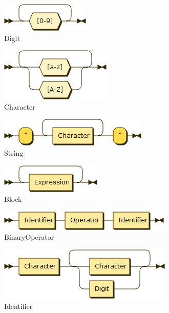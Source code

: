 \begin{figure}[h!]
\centering
\includegraphics[scale=1]{kepek/rr_digit.png}
\caption{Digit}
\label{fig:rr_digit}
\end{figure}

\begin{figure}[h!]
\centering
\includegraphics[scale=1]{kepek/rr_character.png}
\caption{Character}
\label{fig:rr_character}
\end{figure}

\begin{figure}[h!]
\centering
\includegraphics[scale=1]{kepek/rr_string.png}
\caption{String}
\label{fig:rr_string}
\end{figure}

\begin{figure}[h!]
\centering
\includegraphics[scale=1]{kepek/rr_block.png}
\caption{Block}
\label{fig:rr_block}
\end{figure}

\begin{figure}[h!]
\centering
\includegraphics[scale=1]{kepek/rr_binaryoperator.png}
\caption{BinaryOperator}
\label{fig:rr_binaryoperator}
\end{figure}

\begin{figure}[h!]
\centering
\includegraphics[scale=0.5]{kepek/rr_identifier.png}
\caption{Identifier}
\label{fig:rr_identifier}
\end{figure}

